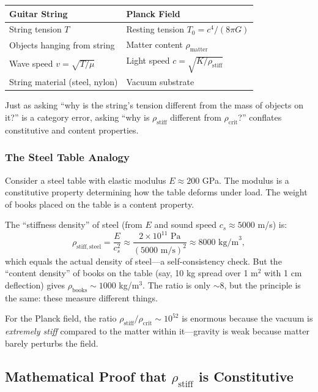 \documentclass[11pt,a4paper]{article}
\newcommand{\ee}[1]{\times 10^{#1}}
\newcommand{\rhocrit}{\ensuremath{\rho_{\mathrm{crit}}}}
\newcommand{\rhostiff}{\ensuremath{\rho_{\mathrm{stiff}}}}
\newcommand{\Tzero}{\ensuremath{T_0}}
\theoremstyle{definition}
\begin{document}
\begin{center}
\begin{tabular}{@{}ll@{}}
\toprule
\textbf{Guitar String} & \textbf{Planck Field} \\
\midrule
String tension $T$ & Resting tension $\Tzero = c^4/(8\pi G)$ \\
Objects hanging from string & Matter content $\rho_{\mathrm{matter}}$ \\
Wave speed $v = \sqrt{T/\mu}$ & Light speed $c = \sqrt{K/\rhostiff}$ \\
String material (steel, nylon) & Vacuum substrate \\
\bottomrule
\end{tabular}
\end{center}

Just as asking ``why is the string's tension different from the mass of objects on it?'' is a category error, asking ``why is $\rhostiff$ different from $\rhocrit$?'' conflates constitutive and content properties.

\subsubsection{The Steel Table Analogy}
\label{sec:table_analogy}

Consider a steel table with elastic modulus $E \approx 200$ GPa. The modulus is a constitutive property determining how the table deforms under load. The weight of books placed on the table is a content property.

The ``stiffness density'' of steel (from $E$ and sound speed $c_s \approx 5000$ m/s) is:
\begin{equation}
\rho_{\mathrm{stiff,steel}} = \frac{E}{c_s^2} \approx \frac{2 \ee{11} \text{ Pa}}{(5000 \text{ m/s})^2} \approx 8000 \text{ kg/m}^3,
\end{equation}
which equals the actual density of steel---a self-consistency check. But the ``content density'' of books on the table (say, 10 kg spread over 1 m$^2$ with 1 cm deflection) gives $\rho_{\mathrm{books}} \sim 1000$ kg/m$^3$. The ratio is only $\sim 8$, but the principle is the same: these measure different things.

For the Planck field, the ratio $\rhostiff/\rhocrit \sim 10^{52}$ is enormous because the vacuum is \emph{extremely stiff} compared to the matter within it---gravity is weak because matter barely perturbs the field.

\subsection{Mathematical Proof that $\rhostiff$ is Constitutive}
\label{sec:proof_constitutive}
\end{document}
